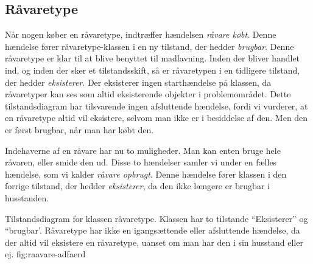 \subsection{Råvaretype}
Når nogen køber en råvaretype, indtræffer hændelsen \textit{råvare købt}. Denne hændelse fører råvaretype-klassen i en ny tilstand, der hedder \textit{brugbar}. Denne råvaretype er klar til at blive benyttet til madlavning. Inden der bliver handlet ind, og inden der sker et tilstandsskift, så er råvaretypen i en tidligere tilstand, der hedder \textit{eksisterer}. Der eksisterer ingen starthændelse på klassen, da råvaretyper kan ses som altid eksisterende objekter i problemområdet. Dette tilstandsdiagram har tilsvarende ingen afsluttende hændelse, fordi vi vurderer, at en råvaretype altid vil eksistere, selvom man ikke er i besiddelse af den. Men den er først brugbar, når man har købt den. 

Indehaverne af en råvare har nu to muligheder. Man kan enten bruge hele råvaren, eller smide den ud. Disse to hændelser samler vi  under en fælles hændelse, som vi kalder \textit{råvare opbrugt}. Denne hændelse fører klassen i den forrige tilstand, der hedder \textit{eksisterer}, da den ikke længere er brugbar i husstanden. 

  {Tilstandsdiagram for klassen råvaretype. Klassen har to tilstande ``Eksisterer'' og ``brugbar'. Råvaretype har ikke en igangsættende eller afsluttende hændelse, da der altid vil eksistere en råvaretype, uanset om man har den i sin husstand eller ej.}
  {fig:raavare-adfaerd}
